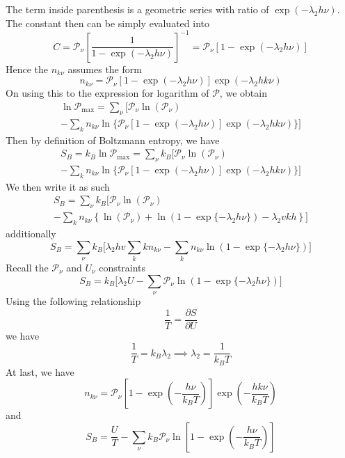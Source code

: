 \documentclass[../../../Main.tex]{subfiles}
\begin{document}
The term inside parenthesis is a geometric series with ratio of $\exp(-\lambda_2h\nu)$. The constant then can be simply evaluated into 
\begin{equation*}
    C=\mathcal{P}_\nu\left[\frac{1}{1-\exp(-\lambda_2h\nu)}\right]^{-1} = \mathcal{P}_\nu\left[1-\exp(-\lambda_2h\nu)\right]
\end{equation*}
Hence the $n_{k\nu}$ assumes the form 
\begin{equation*}
    n_{k\nu}=\mathcal{P}_\nu\left[1-\exp(-\lambda_2h\nu)\right]\exp\left(-\lambda_2hk\nu\right)
\end{equation*}
On using this to the expression for logarithm of $\mathcal{P}$, we obtain
\begin{multline*}
    \ln \mathcal{P}_{\max}= \sum_\nu \bigg[ \mathcal{P}_\nu \ln \left(\mathcal{P}_\nu\right) \\
    - \sum_{k} n_{k\nu}\ln \{\mathcal{P}_\nu\left[1-\exp(-\lambda_2h\nu)\right]\exp\left(-\lambda_2hk\nu\right) \} \bigg]
\end{multline*}
Then by definition of Boltzmann entropy, we have
\begin{multline*}
    S_B=k_B \ln \mathcal{P}_{\max}= \sum_\nu k_B \bigg[ \mathcal{P}_\nu \ln \left(\mathcal{P}_\nu\right) \\
    - \sum_{k} n_{k\nu}\ln \{\mathcal{P}_\nu\left[1-\exp(-\lambda_2h\nu)\right]\exp\left(-\lambda_2hk\nu\right) \} \bigg]
\end{multline*}
We then write it as such 
\begin{multline*}
    S_B= \sum_\nu k_B \bigg[ \mathcal{P}_\nu \ln \left(\mathcal{P}_\nu\right) \\
    - \sum_{k} n_{k\nu}\left\{\ln(\mathcal{P}_\nu)+\ln (1-\exp\{-\lambda_2h\nu\})-\lambda_2vkh\right\} \bigg]
\end{multline*}
additionally
\begin{equation*}
    S_B= \sum_\nu k_B \bigg[\lambda_2hv\sum_{k}kn_{k\nu} - \sum_{k} n_{k\nu}\ln (1-\exp\{-\lambda_2h\nu\})\bigg]
\end{equation*}
Recall the $\mathcal{P}_\nu$ and $U_\nu$ constraints
\begin{equation*}
    S_B= k_B \bigg[\lambda_2U- \sum_\nu\mathcal{P}_\nu \ln (1-\exp\{-\lambda_2h\nu\})\bigg]
\end{equation*}
Using the following relationship
\begin{equation*}
    \frac{1}{T}=\frac{\partial S}{\partial U}
\end{equation*}
we have
\begin{equation*}
    \frac{1}{T}=k_B\lambda_2\implies \lambda_2=\frac{1}{k_BT}
\end{equation*}
At last, we have 
\begin{equation*}
    n_{k\nu}=\mathcal{P}_\nu\left[1-\exp\left(-\frac{h\nu}{k_BT}\right)\right]\exp\left(-\frac{hk\nu}{k_BT}\right)
\end{equation*}
and
\begin{equation*}
    S_B= \frac{U}{T}- \sum_\nu k_B\mathcal{P}_\nu \ln \left[1-\exp\left(-\frac{h\nu}{k_BT}\right)\right]
\end{equation*}
\end{document}
